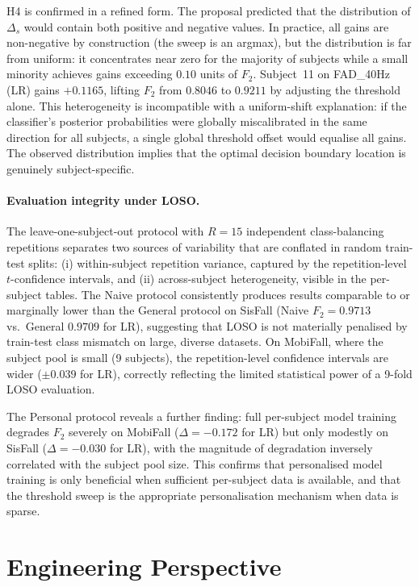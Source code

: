 \documentclass[onluarkali,ingilizce,yukseklisans,karton,LisansustuEgitim]{itutez}
\providecommand{\1}{\mathbf{1}}
\begin{document}
H4 is confirmed in a refined form.  The proposal predicted that the distribution
of $\Delta_s$ would contain both positive and negative values.  In practice, all
gains are non-negative by construction (the sweep is an argmax), but the
distribution is far from uniform: it concentrates near zero for the majority of
subjects while a small minority achieves gains exceeding $0.10$ units of $F_2$.
Subject~11 on FAD\_40Hz (LR) gains $+0.1165$, lifting $F_2$ from $0.8046$ to
$0.9211$ by adjusting the threshold alone.  This heterogeneity is incompatible with
a uniform-shift explanation: if the classifier's posterior probabilities were
globally miscalibrated in the same direction for all subjects, a single global
threshold offset would equalise all gains.  The observed distribution implies that
the optimal decision boundary location is genuinely subject-specific.

\paragraph{Evaluation integrity under LOSO.}
The leave-one-subject-out protocol with $R=15$ independent class-balancing
repetitions separates two sources of variability that are conflated in random
train-test splits: (i) within-subject repetition variance, captured by the
repetition-level $t$-confidence intervals, and (ii) across-subject heterogeneity,
visible in the per-subject tables.  The Naive protocol consistently produces results
comparable to or marginally lower than the General protocol on SisFall (Naive
$F_2=0.9713$ vs.\ General $0.9709$ for LR), suggesting that LOSO is not
materially penalised by train-test class mismatch on large, diverse datasets.  On
MobiFall, where the subject pool is small (9 subjects), the repetition-level
confidence intervals are wider ($\pm0.039$ for LR), correctly reflecting the
limited statistical power of a 9-fold LOSO evaluation.

The Personal protocol reveals a further finding: full per-subject model training
degrades $F_2$ severely on MobiFall ($\Delta = -0.172$ for LR) but only modestly on
SisFall ($\Delta = -0.030$ for LR), with the magnitude of degradation inversely
correlated with the subject pool size.  This confirms that personalised model
training is only beneficial when sufficient per-subject data is available, and that
the threshold sweep is the appropriate personalisation mechanism when data is sparse.

\section{Engineering Perspective}
\label{subsec:conclusion-eng}
\end{document}
